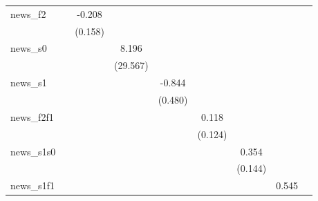 {\begin{tabular}{l*{8}{c}}
\addlinespace
news\_f2     &                     &      -0.208         &                     &                     &                     &                     &                     &                     \\
            &                     &     (0.158)         &                     &                     &                     &                     &                     &                     \\
\addlinespace
news\_s0     &                     &                     &       8.196         &                     &                     &                     &                     &                     \\
            &                     &                     &    (29.567)         &                     &                     &                     &                     &                     \\
\addlinespace
news\_s1     &                     &                     &                     &      -0.844\sym{*}  &                     &                     &                     &                     \\
            &                     &                     &                     &     (0.480)         &                     &                     &                     &                     \\
\addlinespace
news\_f2f1   &                     &                     &                     &                     &       0.118         &                     &                     &                     \\
            &                     &                     &                     &                     &     (0.124)         &                     &                     &                     \\
\addlinespace
news\_s1s0   &                     &                     &                     &                     &                     &       0.354\sym{**} &                     &                     \\
            &                     &                     &                     &                     &                     &     (0.144)         &                     &                     \\
\addlinespace
news\_s1f1   &                     &                     &                     &                     &                     &                     &       0.545         &                     \\

\end{tabular}}
